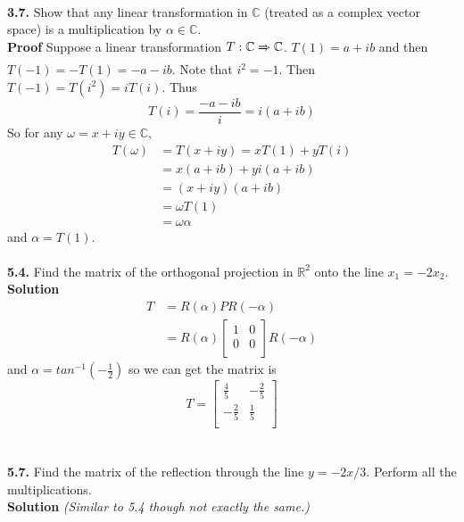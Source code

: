 \documentclass[11pt, a4paper]{article}
\begin{document}
\\
\textbf{3.7.} Show that any linear transformation in $\mathbb{C}$ (treated as a complex vector space) is a multiplication by $\alpha \in \mathbb{C}$.\\
\textbf{Proof} Suppose a linear transformation $T: \mathbb{C} \xRightarrow{} \mathbb{C}$. $T(1)=a+ib$ and then $T(-1)=-T(1)=-a-ib$. Note that $i^2=-1$. Then $T(-1)=T(i^2)=iT(i)$. Thus 
$$ T(i)=\frac{-a-ib}{i}=i(a+ib)$$
So for any $\omega=x+iy \in \mathbb{C}$,
\begin{equation*}
\begin{split}
    T(\omega) & = T(x+iy) = xT(1)+yT(i) \\
              & = x(a+ib)+yi(a+ib) \\
              & = (x+iy)(a+ib) \\
              & = \omega T(1) \\
              & = \omega \alpha
\end{split}
\end{equation*}
and $\alpha = T(1)$.
\\
\\ \textbf{5.4.} Find the matrix of the orthogonal projection in $\mathbb{R}^2$ onto the line $x_1 = -2x_2$.\\
\textbf{Solution} 
\begin{equation*}
  \begin{split}
    T &= 
    R(\alpha)PR(-\alpha) \\
    &=
    R(\alpha)
    \begin{bmatrix}
    1 & 0 \\
    0 & 0 \\
    \end{bmatrix}
    R(-\alpha)
  \end{split}
\end{equation*}
and $\alpha = tan^{-1}(-\frac{1}{2})$ so we can get the matrix is 
\begin{equation*}
    T = 
    \begin{bmatrix}
    \frac{4}{5} & -\frac{2}{5} \\
    -\frac{2}{5} & \frac{1}{5} \\
    \end{bmatrix}
\end{equation*}
\\
\\ \textbf{5.7.} Find the matrix of the reflection through the line $y=-2x/3$. Perform all the multiplications.\\
\textbf{Solution} \emph{(Similar to 5.4 though not exactly the same.)} \\
\end{document}
